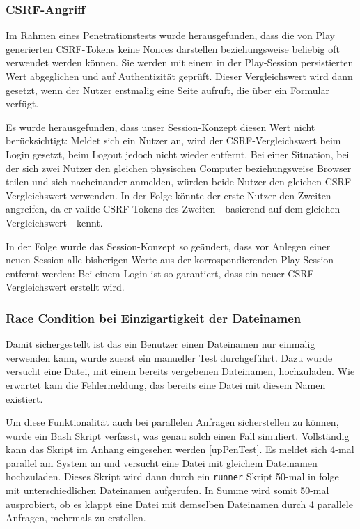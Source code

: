 \documentclass[12pt,DIV14,BCOR10mm,a4paper,parskip=half-,headsepline,headinclude,english,ngerman,bibliography=totocnumbered]{scrreprt}
\begin{document}
\subsubsection{CSRF-Angriff}
\label{CSRF:ANGRIFF}
Im Rahmen eines Penetrationstests wurde herausgefunden, dass die von Play generierten CSRF-Tokens keine Nonces darstellen beziehungsweise beliebig oft verwendet werden können. Sie werden mit einem in der Play-Session persistierten Wert abgeglichen und auf Authentizität geprüft. Dieser Vergleichswert wird dann gesetzt, wenn der Nutzer erstmalig eine Seite aufruft, die über ein Formular verfügt.

Es wurde herausgefunden, dass unser Session-Konzept diesen Wert nicht berücksichtigt: Meldet sich ein Nutzer an, wird der CSRF-Vergleichswert beim Login gesetzt, beim Logout jedoch nicht wieder entfernt. Bei einer Situation, bei der sich zwei Nutzer den gleichen physischen Computer beziehungsweise Browser teilen und sich nacheinander anmelden, würden beide Nutzer den gleichen CSRF-Vergleichswert verwenden. In der Folge könnte der erste Nutzer den Zweiten angreifen, da er valide CSRF-Tokens des Zweiten - basierend auf dem gleichen Vergleichswert - kennt.

In der Folge wurde das Session-Konzept so geändert, dass vor Anlegen einer neuen Session alle bisherigen Werte aus der korrospondierenden Play-Session entfernt werden: Bei einem Login ist so garantiert, dass ein neuer CSRF-Vergleichswert erstellt wird.

\subsubsection{Race Condition bei Einzigartigkeit der Dateinamen}
Damit sichergestellt ist das ein Benutzer einen Dateinamen nur einmalig verwenden kann, wurde zuerst ein manueller Test durchgeführt. Dazu wurde versucht eine Datei, mit einem bereits vergebenen Dateinamen, hochzuladen. Wie erwartet kam die Fehlermeldung, das bereits eine Datei mit diesem Namen existiert.

Um diese Funktionalität auch bei parallelen Anfragen sicherstellen zu können, wurde ein Bash Skript verfasst, was genau solch einen Fall simuliert. Vollständig kann das Skript im Anhang eingesehen werden \ref{upPenTest}. Es meldet sich 4-mal parallel am System an und versucht eine Datei mit gleichem Dateinamen hochzuladen. Dieses Skript wird dann durch ein \texttt{runner} Skript 50-mal in folge mit unterschiedlichen Dateinamen aufgerufen. In Summe wird somit 50-mal ausprobiert, ob es klappt eine Datei mit demselben Dateinamen durch 4 parallele Anfragen, mehrmals zu erstellen.
\end{document}
